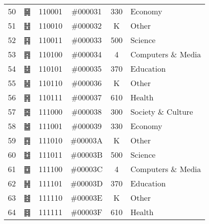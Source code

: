 \documentclass{article}
\begin{document}
\begin{longtable}{|r|c|c|c|c|l|}
50 & ䷱ & 110001  & \#000031 & 330 & Economy \\
51 & ䷲ & 110010  & \#000032 & K   & Other \\
52 & ䷳ & 110011  & \#000033 & 500 & Science \\
53 & ䷴ & 110100  & \#000034 & 4   & Computers \& Media \\
54 & ䷵ & 110101  & \#000035 & 370 & Education \\
55 & ䷶ & 110110  & \#000036 & K   & Other \\
56 & ䷷ & 110111  & \#000037 & 610 & Health \\
57 & ䷸ & 111000  & \#000038 & 300 & Society \& Culture \\
58 & ䷹ & 111001  & \#000039 & 330 & Economy \\
59 & ䷺ & 111010  & \#00003A & K   & Other \\
60 & ䷻ & 111011  & \#00003B & 500 & Science \\
61 & ䷼ & 111100  & \#00003C & 4   & Computers \& Media \\
62 & ䷽ & 111101  & \#00003D & 370 & Education \\
63 & ䷾ & 111110  & \#00003E & K   & Other \\
64 & ䷿ & 111111  & \#00003F & 610 & Health \\
\hline
\end{longtable}
\end{document}
